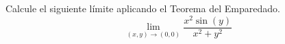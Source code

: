 Calcule el siguiente límite aplicando el Teorema del Emparedado.
\[
\lim_{(x,y)\to(0,0)} \frac{x^2 \sin(y)}{x^2 + y^2}
\]